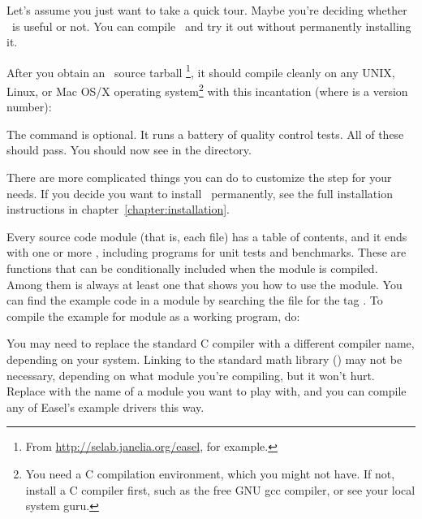 Let's assume you just want to take a quick tour. Maybe you're deciding
whether \Easel\ is useful or not. You can compile \Easel\ and try it out
without permanently installing it.

After you obtain an \Easel\ source tarball
\footnote{From \url{http://selab.janelia.org/easel}, for example.}, it
should compile cleanly on any UNIX, Linux, or Mac OS/X operating
system\footnote{You need a C compilation environment, which you might
not have. If not, install a C compiler first, such as the free GNU gcc
compiler, or see your local system guru.} with this incantation (where
 is a version number):

\begin{cchunk}
\end{cchunk}

The  command is optional. It runs a battery of
quality control tests. All of these should pass. You should now see
 in the directory.

There are more complicated things you can do to customize the
 step for your needs. If you decide you want to
install \Easel\ permanently, see the full installation instructions in
chapter~\ref{chapter:installation}.

Every source code module (that is, each  file) has a table
of contents, and it ends with one or more ,
including programs for unit tests and benchmarks. These are
 functions that can be conditionally included when the
module is compiled. Among them is always at least one  that shows you how to use the module. You can find the example
code in a module  by searching the  file
for the tag . To compile the example for module
 as a working program, do:

\begin{cchunk}
\end{cchunk}

You may need to replace the standard C compiler  with a
different compiler name, depending on your system. Linking to the
standard math library () may not be necessary, depending on
what module you're compiling, but it won't hurt. Replace 
with the name of a module you want to play with, and you can compile
any of Easel's example drivers this way.

